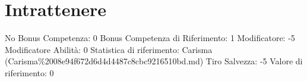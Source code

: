 \section{Intrattenere}\label{intrattenere}

\begin{description}
\tightlist
\item[Tags: ABI]
No Bonus Competenza: 0 Bonus Competenza di Riferimento: 1 Modificatore:
-5 Modificatore Abilità: 0 Statistica di riferimento: Carisma
(Carisma\%2008e94f672d6d4d4487c8cbc9216510bd.md) Tiro Salvezza: -5
Valore di riferimento: 0
\end{description}
